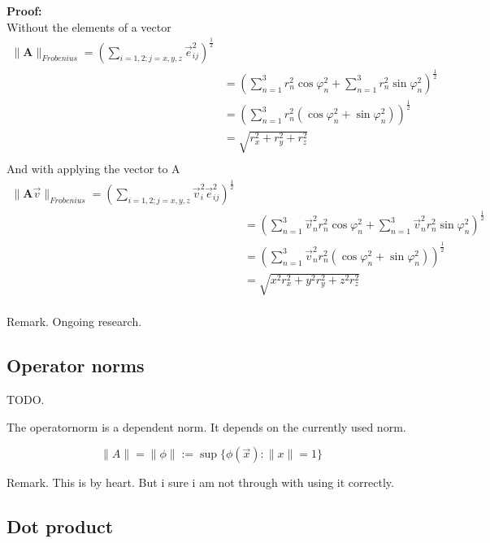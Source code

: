 \documentclass[a4paper]{article}
\begin{document}
\textbf{Proof:}\\
Without the elements of a vector 
\begin{displaymath}
\begin{align}
\|\boldsymbol{A}\|_{Frobenius} = (\sum_{i=1,2;j=x,y,z}\vec{e}_{ij}^{2})^{\frac{1}{2}} \\
&= (\sum_{n=1}^{3}r_{n}^{2}\cos\varphi_n^{2} + \sum_{n=1}^{3}r_{n}^{2}\sin\varphi_n^{2})^{\frac{1}{2}}\\
&= (\sum_{n=1}^{3}r_{n}^{2}(\cos\varphi_n^{2} + \sin\varphi_n^{2}))^{\frac{1}{2}}\\
&= \sqrt{r_{x}^{2}+r_{y}^{2}+r_{z}^{2}}\\
\end{align}
\end{displaymath}
And with applying the vector to A
\begin{displaymath}
\begin{align}
\|\boldsymbol{A}\vec{v}\|_{Frobenius} = (\sum_{i=1,2;j=x,y,z}\vec{v}_{i}^{2}\vec{e}_{ij}^{2})^{\frac{1}{2}} \\
&= (\sum_{n=1}^{3}\vec{v}_{n}^{2}r_{n}^{2}\cos\varphi_n^{2} + \sum_{n=1}^{3}\vec{v}_{n}^{2}r_{n}^{2}\sin\varphi_n^{2})^{\frac{1}{2}}\\
&= (\sum_{n=1}^{3}\vec{v}_{n}^{2}r_{n}^{2}(\cos\varphi_n^{2} + \sin\varphi_n^{2}))^{\frac{1}{2}}\\
&= \sqrt{x^{2}r_{x}^{2}+y^{2}r_{y}^{2}+z^{2}r_{z}^{2}}\\
\end{align}
\end{displaymath}

Remark. Ongoing research.

\subsection{Operator norms}

TODO.

The operatornorm is a dependent norm. It depends on the currently used norm. 

\begin{displaymath}
\|A\| = \|\phi\| := \sup\{ \phi(\vec{x}) : \|x\|=1 \}
\end{displaymath}

Remark. This is by heart. But i sure i am not through with using it correctly.

\subsection{Dot product}
\end{document}
